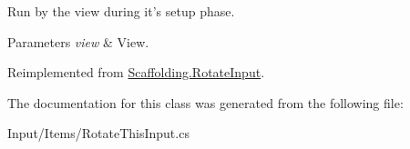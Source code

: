 Run by the view during it's setup phase. 


\begin{DoxyParams}{Parameters}
{\em view} & View.\\
\hline
\end{DoxyParams}


Reimplemented from \hyperlink{class_scaffolding_1_1_rotate_input_a89be6ed5c624ff8f637fdc38227c4637}{Scaffolding.\-Rotate\-Input}.



The documentation for this class was generated from the following file\-:\begin{DoxyCompactItemize}
\item 
Input/\-Items/Rotate\-This\-Input.\-cs\end{DoxyCompactItemize}
